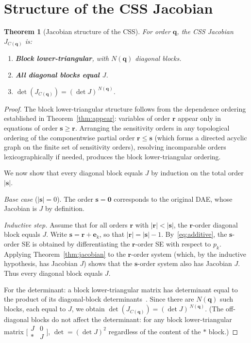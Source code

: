 \documentclass[12pt,a4paper]{article}
\theoremstyle{definition}
\theoremstyle{plain}
\newtheorem{theorem}{Theorem}[section]
\theoremstyle{remark}
\newcommand{\vq}{\mathbf{q}}
\newcommand{\vr}{\mathbf{r}}
\newcommand{\vs}{\mathbf{s}}
\newcommand{\vzero}{\mathbf{0}}
\begin{document}
\section{Structure of the CSS Jacobian}

\begin{theorem}[Jacobian structure of the CSS]
\label{thm:jacobian_shape}
For order $\vq$, the CSS Jacobian $J_{C(\vq)}$ is:
\begin{enumerate}[nosep]
  \item \textbf{Block lower-triangular}, with $N(\vq)$ diagonal blocks.
  \item \textbf{All diagonal blocks equal $J$}.
  \item $\det(J_{C(\vq)}) = (\det J)^{\,N(\vq)}$.
\end{enumerate}
\end{theorem}

\begin{proof}
The block lower-triangular structure follows from the dependence ordering established in Theorem~\ref{thm:appear}: variables of order $\vr$ appear only in equations of order $\vs \ge \vr$. Arranging the sensitivity orders in any topological ordering of the componentwise partial order $\vr \le \vs$ (which forms a directed acyclic graph on the finite set of sensitivity orders), resolving incomparable orders lexicographically if needed, produces the block lower-triangular ordering.

We now show that every diagonal block equals $J$ by induction on the total order $|\vs|$.

\emph{Base case} ($|\vs| = 0$). The order $\vs = \vzero$ corresponds to the original DAE, whose Jacobian is $J$ by definition.

\emph{Inductive step.} Assume that for all orders $\vr$ with $|\vr| < |\vs|$, the $\vr$-order diagonal block equals $J$. Write $\vs = \vr + \mathbf{e}_k$, so that $|\vr| = |\vs| - 1$. By~\eqref{eq:additive}, the $\vs$-order SE is obtained by differentiating the $\vr$-order SE with respect to $p_k$. Applying Theorem~\ref{thm:jacobian} to the $\vr$-order system (which, by the inductive hypothesis, has Jacobian $J$) shows that the $\vs$-order system also has Jacobian $J$. Thus every diagonal block equals $J$.

For the determinant: a block lower-triangular matrix has determinant equal to the product of its diagonal-block determinants~\cite{golub2013matrix}. Since there are $N(\vq)$ such blocks, each equal to $J$, we obtain $\det(J_{C(\vq)}) = (\det J)^{\,N(\vq)}$. (The off-diagonal blocks do not affect the determinant: for any block lower-triangular matrix $\bigl[\begin{smallmatrix} J & 0 \\ * & J \end{smallmatrix}\bigr]$, $\det = (\det J)^2$ regardless of the content of the $*$ block.)
\end{proof}
\end{document}
